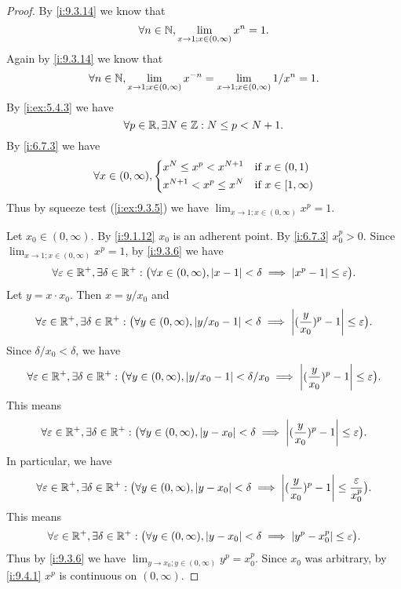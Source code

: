 \begin{proof}
  By \cref{i:9.3.14} we know that
  \[
    \forall n \in \mathbb{N}, \lim_{x \to 1 ; x \in (0, \infty)} x^n = 1.
  \]
  Again by \cref{i:9.3.14} we know that
  \[
    \forall n \in \mathbb{N}, \lim_{x \to 1 ; x \in (0, \infty)} x^{-n} = \lim_{x \to 1 ; x \in (0, \infty)} 1 / x^n = 1.
  \]
  By \cref{i:ex:5.4.3} we have
  \[
    \forall p \in \mathbb{R}, \exists N \in \mathbb{Z} : N \leq p < N + 1.
  \]
  By \cref{i:6.7.3} we have
  \[
    \forall x \in (0, \infty), \begin{dcases}
      x^N \leq x^p < x^{N + 1}   & \text{if } x \in (0, 1)      \\
      x^{N + 1} < x^p \leq x^{N} & \text{if } x \in [1, \infty)
    \end{dcases}
  \]
  Thus by squeeze test (\cref{i:ex:9.3.5}) we have \(\lim_{x \to 1 ; x \in (0, \infty)} x^p = 1\).

  Let \(x_0 \in (0, \infty)\).
  By \cref{i:9.1.12} \(x_0\) is an adherent point.
  By \cref{i:6.7.3} \(x_0^p > 0\).
  Since \(\lim_{x \to 1 ; x \in (0, \infty)} x^p = 1\), by \cref{i:9.3.6} we have
  \[
    \forall \varepsilon \in \mathbb{R}^+, \exists \delta \in \mathbb{R}^+ : \big(\forall x \in (0, \infty), \left\lvert x - 1\right\rvert < \delta \implies \left\lvert x^p - 1\right\rvert \leq \varepsilon\big).
  \]
  Let \(y = x \cdot x_0\).
  Then \(x = y / x_0\) and
  \[
    \forall \varepsilon \in \mathbb{R}^+, \exists \delta \in \mathbb{R}^+ : \big(\forall y \in (0, \infty), \left\lvert y / x_0 - 1\right\rvert < \delta \implies \left\lvert(\dfrac{y}{x_0})^p - 1\right\rvert \leq \varepsilon\big).
  \]
  Since \(\delta / x_0 < \delta\), we have
  \[
    \forall \varepsilon \in \mathbb{R}^+, \exists \delta \in \mathbb{R}^+ : \big(\forall y \in (0, \infty), \left\lvert y / x_0 - 1\right\rvert < \delta / x_0 \implies \left\lvert(\dfrac{y}{x_0})^p - 1\right\rvert \leq \varepsilon\big).
  \]
  This means
  \[
    \forall \varepsilon \in \mathbb{R}^+, \exists \delta \in \mathbb{R}^+ : \big(\forall y \in (0, \infty), \left\lvert y - x_0\right\rvert < \delta \implies \left\lvert(\dfrac{y}{x_0})^p - 1\right\rvert \leq \varepsilon\big).
  \]
  In particular, we have
  \[
    \forall \varepsilon \in \mathbb{R}^+, \exists \delta \in \mathbb{R}^+ : \big(\forall y \in (0, \infty), \left\lvert y - x_0\right\rvert < \delta \implies \left\lvert(\dfrac{y}{x_0})^p - 1\right\rvert \leq \dfrac{\varepsilon}{x_0^p}\big).
  \]
  This means
  \[
    \forall \varepsilon \in \mathbb{R}^+, \exists \delta \in \mathbb{R}^+ : \big(\forall y \in (0, \infty), \left\lvert y - x_0\right\rvert < \delta \implies \left\lvert y^p - x_0^p\right\rvert \leq \varepsilon\big).
  \]
  Thus by \cref{i:9.3.6} we have \(\lim_{y \to x_0 ; y \in (0, \infty)} y^p = x_0^p\).
  Since \(x_0\) was arbitrary, by \cref{i:9.4.1} \(x^p\) is continuous on \((0, \infty)\).
\end{proof}

